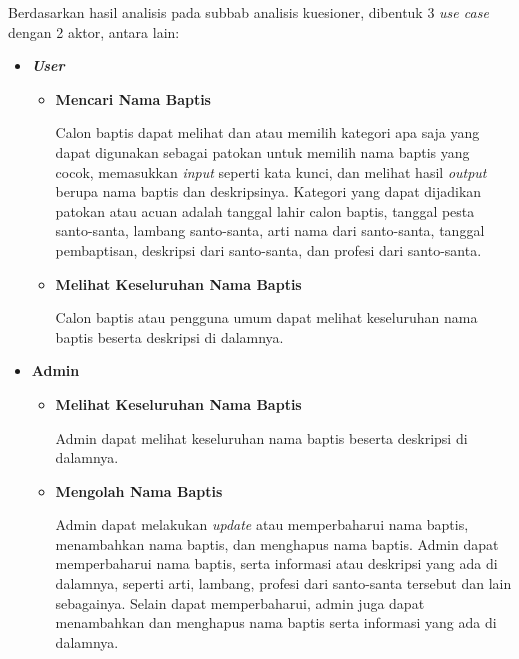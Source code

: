 	Berdasarkan hasil analisis  pada subbab analisis kuesioner, dibentuk 3 \textit{use case} dengan 2 aktor, antara lain:
	\begin{itemize}
			\item \textbf{\textit{User}}
				\begin{itemize}
					\item \textbf{Mencari Nama Baptis}

					Calon baptis dapat melihat dan atau memilih kategori apa saja yang dapat digunakan sebagai patokan untuk memilih nama baptis yang cocok, memasukkan \textit{input} seperti kata kunci, dan melihat hasil \textit{output} berupa nama baptis dan deskripsinya. Kategori yang dapat dijadikan patokan atau acuan adalah tanggal lahir calon baptis, tanggal pesta santo-santa, lambang santo-santa, arti nama dari santo-santa, tanggal pembaptisan, deskripsi dari santo-santa, dan profesi dari santo-santa.


					\item \textbf{Melihat Keseluruhan Nama Baptis}

					Calon baptis atau pengguna umum dapat melihat keseluruhan nama baptis beserta deskripsi di dalamnya.
				\end{itemize}
			\item \textbf{Admin}
				\begin{itemize}
				\item \textbf{Melihat Keseluruhan Nama Baptis}

					Admin dapat melihat keseluruhan nama baptis beserta deskripsi di dalamnya.
					
					\item \textbf{Mengolah Nama Baptis}

					Admin dapat melakukan \textit{update} atau memperbaharui nama baptis, menambahkan nama baptis, dan menghapus nama baptis. Admin dapat memperbaharui nama baptis, serta informasi atau deskripsi yang ada di dalamnya, seperti arti, lambang, profesi dari santo-santa tersebut dan lain sebagainya. Selain dapat memperbaharui, admin juga dapat menambahkan dan menghapus nama baptis serta informasi yang ada di dalamnya.


\end{itemize}
\end{itemize}
